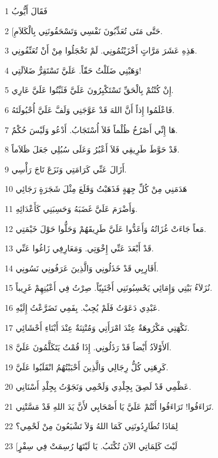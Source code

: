 \par 1 فَقَالَ أَيُّوبُ
\par 2 [حَتَّى مَتَى تُعَذِّبُونَ نَفْسِي وَتَسْحَقُونَنِي بِالْكَلاَمِ.
\par 3 هَذِهِ عَشَرَ مَرَّاتٍ أَخْزَيْتُمُونِي. لَمْ تَخْجَلُوا مِنْ أَنْ تُعَنِّفُونِي.
\par 4 وَهَبْنِي ضَلَلْتُ حَقّاً. عَلَيَّ تَسْتَقِرُّ ضَلاَلَتِي!
\par 5 إِنْ كُنْتُمْ بِالْحَقِّ تَسْتَكْبِرُونَ عَلَيَّ فَثَبِّتُوا عَلَيَّ عَارِي.
\par 6 فَاعْلَمُوا إِذاً أَنَّ اللهَ قَدْ عَوَّجَنِي وَلَفَّ عَلَيَّ أُحْبُولَتَهُ.
\par 7 هَا إِنِّي أَصْرُخُ ظُلْماً فَلاَ أُسْتَجَابُ. أَدْعُو وَلَيْسَ حُكْمٌ.
\par 8 قَدْ حَوَّطَ طَرِيقِي فَلاَ أَعْبُرُ وَعَلَى سُبُلِي جَعَلَ ظَلاَماً.
\par 9 أَزَالَ عَنِّي كَرَامَتِي وَنَزَعَ تَاجَ رَأْسِي.
\par 10 هَدَمَنِي مِنْ كُلِّ جِهَةٍ فَذَهَبْتُ وَقَلَعَ مِثْلَ شَجَرَةٍ رَجَائِي
\par 11 وَأَضْرَمَ عَلَيَّ غَضَبَهُ وَحَسِبَنِي كَأَعْدَائِهِ.
\par 12 مَعاً جَاءَتْ غُزَاتُهُ وَأَعَدُّوا عَلَيَّ طَرِيقَهُمْ وَحَلُّوا حَوْلَ خَيْمَتِي.
\par 13 قَدْ أَبْعَدَ عَنِّي إِخْوَتِي. وَمَعَارِفِي زَاغُوا عَنِّي.
\par 14 أَقَارِبِي قَدْ خَذَلُونِي وَالَّذِينَ عَرَفُونِي نَسُونِي.
\par 15 نُزَلاَءُ بَيْتِي وَإِمَائِي يَحْسِبُونَنِي أَجْنَبِيّاً. صِرْتُ فِي أَعْيُنِهِمْ غَرِيباً.
\par 16 عَبْدِي دَعَوْتُ فَلَمْ يُجِبْ. بِفَمِي تَضَرَّعْتُ إِلَيْهِ.
\par 17 نَكْهَتِي مَكْرُوهَةٌ عِنْدَ امْرَأَتِي وَمُنْتِنَةٌ عِنْدَ أَبْنَاءِ أَحْشَائِي.
\par 18 اَلأَوْلاَدُ أَيْضاً قَدْ رَذَلُونِي. إِذَا قُمْتُ يَتَكَلَّمُونَ عَلَيَّ.
\par 19 كَرِهَنِي كُلُّ رِجَالِي وَالَّذِينَ أَحْبَبْتُهُمُ انْقَلَبُوا عَلَيَّ.
\par 20 عَظْمِي قَدْ لَصِقَ بِجِلْدِي وَلَحْمِي وَنَجَوْتُ بِجِلْدِ أَسْنَانِي.
\par 21 تَرَاءَفُوا! تَرَاءَفُوا أَنْتُمْ عَلَيَّ يَا أَصْحَابِي لأَنَّ يَدَ اللهِ قَدْ مَسَّتْنِي.
\par 22 لِمَاذَا تُطَارِدُونَنِي كَمَا اللهُ وَلاَ تَشْبَعُونَ مِنْ لَحْمِي؟
\par 23 [لَيْتَ كَلِمَاتِي الآنَ تُكْتَبُ. يَا لَيْتَهَا رُسِمَتْ فِي سِفْرٍ
